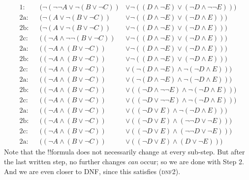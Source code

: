 \documentclass[../../../include/open-logic-section]{subfiles}
\begin{document}
{\small	\begin{align*}
		\text{1:} & & (\lnot (\lnot \lnot A \lor \lnot (B \lor \lnot C)) &\lor \lnot ((D \land \lnot E) \lor (\lnot D \land \lnot \lnot E)))\\
		\text{2a:} & & (\lnot (A \lor \lnot (B \lor \lnot  C)) &\lor \lnot ((D \land \lnot E) \lor (\lnot D \land  E)))\\
		\text{2b:} & & (\lnot (A \lor \lnot (B \lor \lnot  C)) &\lor \lnot ((D \land \lnot E) \lor (\lnot D \land  E)))\\
		\text{2c:} & & ((\lnot A \land \lnot \lnot (B \lor \lnot  C)) &\lor \lnot ((D \land \lnot E) \lor (\lnot D \land  E)))\\
		\text{2a:} & & ((\lnot A \land (B \lor \lnot  C)) &\lor \lnot ((D \land \lnot E) \lor (\lnot D \land  E)))\\
		\text{2b:} & & ((\lnot A \land (B \lor \lnot  C)) &\lor \lnot ((D \land \lnot E) \lor (\lnot D \land  E)))\\
		\text{2c:} & & ((\lnot A \land (B \lor \lnot  C)) &\lor  (\lnot(D \land \lnot E) \land \lnot (\lnot D \land  E)))\\
		\text{2a:} & & ((\lnot A \land (B \lor \lnot  C)) &\lor  (\lnot(D \land \lnot E) \land \lnot (\lnot D \land  E)))\\
		\text{2b:} & & ((\lnot A \land (B \lor \lnot  C)) &\lor  ((\lnot D \land \lnot \lnot E) \land \lnot (\lnot D \land  E)))\\
		\text{2c:} & & ((\lnot A \land (B \lor \lnot  C)) &\lor  ((\lnot D \lor \lnot \lnot E) \land \lnot (\lnot D \land  E)))\\
		\text{2a:} & & ((\lnot A \land (B \lor \lnot  C)) &\lor  ((\lnot D \lor E) \land \lnot (\lnot D \land  E)))\\
		\text{2b:} & & ((\lnot A \land (B \lor \lnot  C)) &\lor  ((\lnot D \lor E) \land (\lnot \lnot D \lor  \lnot E)))\\
		\text{2c:} & & ((\lnot A \land (B \lor \lnot  C)) &\lor  ((\lnot D \lor E) \land (\lnot \lnot D \lor  \lnot E)))\\
		\text{2a:} & & ((\lnot A \land (B \lor \lnot  C)) &\lor  ((\lnot D \lor E) \land (D \lor  \lnot E))) 
	\end{align*}}\noindent 
Note that the !!{formula} does not necessarily change at every sub-step. But after the last written step, no further changes \emph{can} occur; so we are done with Step 2. And we are even closer to DNF, since this satisfies (\textsc{dnf2}). 
\end{document}
